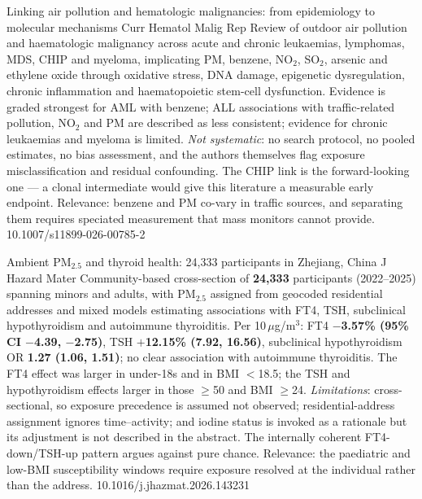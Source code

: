 \documentclass[10pt]{article}
\begin{document}
{Linking air pollution and hematologic malignancies: from epidemiology to molecular
mechanisms}
{Curr Hematol Malig Rep}
{Review of outdoor air pollution and haematologic malignancy across acute and chronic
leukaemias, lymphomas, MDS, CHIP and myeloma, implicating PM, benzene, NO$_2$, SO$_2$,
arsenic and ethylene oxide through oxidative stress, DNA damage, epigenetic dysregulation,
chronic inflammation and haematopoietic stem-cell dysfunction. Evidence is graded
strongest for AML with benzene; ALL associations with traffic-related pollution, NO$_2$
and PM are described as less consistent; evidence for chronic leukaemias and myeloma is
limited. \emph{Not systematic}: no search protocol, no pooled estimates, no bias
assessment, and the authors themselves flag exposure misclassification and residual
confounding. The CHIP link is the forward-looking one --- a clonal intermediate would give
this literature a measurable early endpoint. Relevance: benzene and PM co-vary in traffic
sources, and separating them requires speciated measurement that mass monitors cannot
provide.}
{10.1007/s11899-026-00785-2}

{Ambient PM$_{2.5}$ and thyroid health: 24{,}333 participants in Zhejiang, China}
{J Hazard Mater}
{Community-based cross-section of \textbf{24{,}333} participants (2022--2025) spanning
minors and adults, with PM$_{2.5}$ assigned from geocoded residential addresses and mixed
models estimating associations with FT4, TSH, subclinical hypothyroidism and autoimmune
thyroiditis. Per 10\,$\mu$g/m$^3$: FT4 \textbf{$-$3.57\% (95\% CI $-$4.39, $-$2.75)}, TSH
\textbf{$+$12.15\% (7.92, 16.56)}, subclinical hypothyroidism OR \textbf{1.27 (1.06,
1.51)}; no clear association with autoimmune thyroiditis. The FT4 effect was larger in
under-18s and in BMI $<$18.5; the TSH and hypothyroidism effects larger in those
$\geq$50 and BMI $\geq$24. \emph{Limitations}: cross-sectional, so exposure precedence is
assumed not observed; residential-address assignment ignores time--activity; and iodine
status is invoked as a rationale but its adjustment is not described in the abstract.
The internally coherent FT4-down/TSH-up pattern argues against pure chance. Relevance: the
paediatric and low-BMI susceptibility windows require exposure resolved at the individual
rather than the address.}
{10.1016/j.jhazmat.2026.143231}

\end{document}
